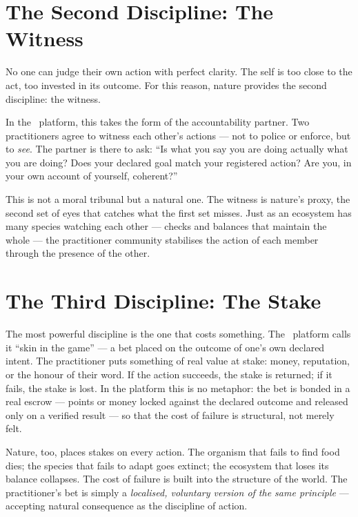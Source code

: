 \section{The Second Discipline: The Witness}

No one can judge their own action with perfect clarity. The self is too close
to the act, too invested in its outcome. For this reason, nature provides the
second discipline: the witness.

In the \praxis\ platform, this takes the form of the accountability partner.
Two practitioners agree to witness each other's actions --- not to police or
enforce, but to \emph{see}. The partner is there to ask: ``Is what you say you
are doing actually what you are doing? Does your declared goal match your
registered action? Are you, in your own account of yourself, coherent?''

This is not a moral tribunal but a natural one. The witness is nature's proxy,
the second set of eyes that catches what the first set misses. Just as an
ecosystem has many species watching each other --- checks and balances that
maintain the whole --- the practitioner community stabilises the action of each
member through the presence of the other.

\section{The Third Discipline: The Stake}

The most powerful discipline is the one that costs something. The \praxis\
platform calls it ``skin in the game'' --- a bet placed on the outcome of one's
own declared intent. The practitioner puts something of real value at stake:
money, reputation, or the honour of their word. If the action succeeds, the
stake is returned; if it fails, the stake is lost. In the platform this is no
metaphor: the bet is bonded in a real escrow --- points or money locked against the
declared outcome and released only on a verified result --- so that the cost of
failure is structural, not merely felt.

Nature, too, places stakes on every action. The organism that fails to find food
dies; the species that fails to adapt goes extinct; the ecosystem that loses its
balance collapses. The cost of failure is built into the structure of the world.
The practitioner's bet is simply a \emph{localised, voluntary version of the
same principle} --- accepting natural consequence as the discipline of action.

